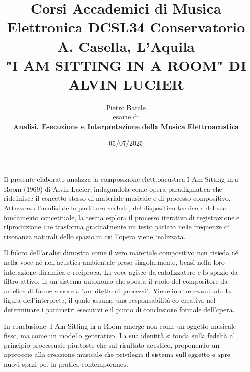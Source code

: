 \documentclass[a4paper,12pt]{article}
\title{Corsi Accademici di Musica Elettronica DCSL34 Conservatorio A. Casella, L'Aquila \\ \vspace{0.5cm} \fontsize{14}{17}\bfseries\uppercase{"I am sitting in a room" di Alvin Lucier}}
\author{Pietro Barale \\ esame di \\\bfseries{Analisi, Esecuzione e Interpretazione della Musica Elettroacustica}}
\date{05/07/2025}
\begin{document}
\maketitle
\thispagestyle{empty}

\begin{center}
    \vspace{1cm}
    \textbf{\fontsize{12}{15}\selectfont{Sommario}}
\end{center}

Il presente elaborato analizza la composizione elettroacustica I Am Sitting in a Room (1969) di Alvin Lucier, indagandola come opera paradigmatica che ridefinisce il concetto stesso di materiale musicale e di processo compositivo. Attraverso l'analisi della partitura verbale, del dispositivo tecnico e del suo fondamento concettuale, la tesina esplora il processo iterativo di registrazione e riproduzione che trasforma gradualmente un testo parlato nelle frequenze di risonanza naturali dello spazio in cui l'opera viene realizzata.

Il fulcro dell'analisi dimostra come il vero materiale compositivo non risieda né nella voce né nell'acustica ambientale prese singolarmente, bensì nella loro interazione dinamica e reciproca. La voce agisce da catalizzatore e lo spazio da filtro attivo, in un sistema autonomo che sposta il ruolo del compositore da artefice di forme sonore a "architetto di processi". Viene inoltre esaminata la figura dell'interprete, il quale assume una responsabilità co-creativa nel determinare i parametri esecutivi e il punto di conclusione formale dell'opera.

In conclusione, I Am Sitting in a Room emerge non come un oggetto musicale fisso, ma come un modello generativo. La sua identità si fonda sulla fedeltà al principio processuale piuttosto che sul risultato acustico, proponendo un approccio alla creazione musicale che privilegia il sistema sull'oggetto e apre nuovi spazi per la pratica contemporanea.
\newpage
\tableofcontents  

\newpage



\nocite{LucierSimon1980}
\nocite{Davis2003}
\nocite{DiScipio2005}
\nocite{GalanteSani2000}
\nocite{Kahn2009}

\nocite{Lucier1994online}


\newpage %
\printbibliography[nottype=online, title={Bibliografia}]

\printbibliography[type=online, title={Sitografia}]
\end{document}
